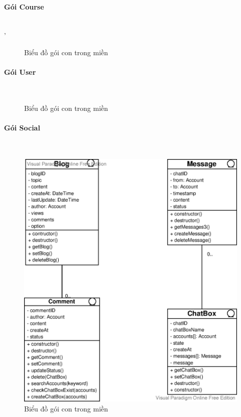 \documentclass[./../main_file.tex]{subfiles}
\begin{document}
	\paragraph{Gói Course} ~\\'
	\begin{figure}[H]
		\centering
		\resizebox{\textwidth}{!}{}
		\caption{Biểu đồ gói con trong miền}
	\end{figure}
		
	\paragraph{Gói User} ~\\
	\begin{figure}[H]
		\centering
		\resizebox{0.9\textwidth}{!}{}
		\caption{Biểu đồ gói con trong miền}
	\end{figure}

	\paragraph{Gói Social}~\\
	\begin{figure}[H]
		\centering
				\includegraphics[width=\linewidth]{./images/PackageSocial_LogicalView.eps}
		\caption{Biểu đồ gói con trong miền}
	\end{figure}
	
\end{document}
